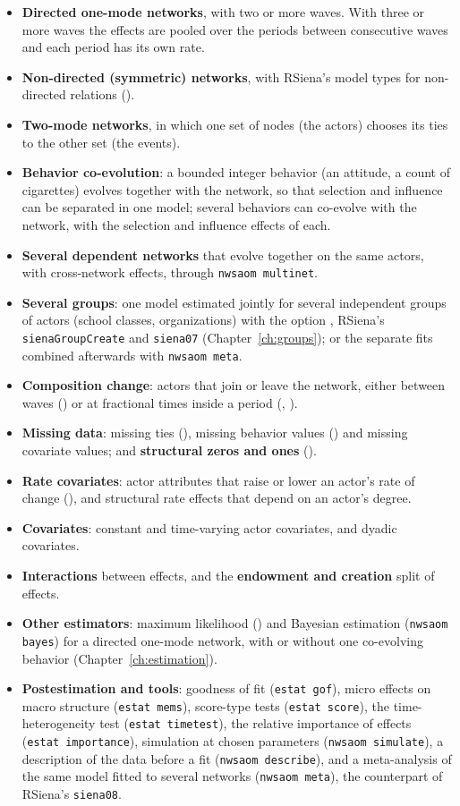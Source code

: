 \begin{itemize}[nosep]
  \item \textbf{Directed one-mode networks}, with two or more waves. With three or more waves the effects are pooled over the periods between consecutive waves and each period has its own rate.
  \item \textbf{Non-directed (symmetric) networks}, with RSiena's model types for non-directed relations ().
  \item \textbf{Two-mode networks}, in which one set of nodes (the actors) chooses its ties to the other set (the events).
  \item \textbf{Behavior co-evolution}: a bounded integer behavior (an attitude, a count of cigarettes) evolves together with the network, so that selection and influence can be separated in one model; several behaviors can co-evolve with the network, with the selection and influence effects of each.
  \item \textbf{Several dependent networks} that evolve together on the same actors, with cross-network effects, through \texttt{nwsaom multinet}.
  \item \textbf{Several groups}: one model estimated jointly for several independent groups of actors (school classes, organizations) with the option , RSiena's \texttt{sienaGroupCreate} and \texttt{siena07} (Chapter~\ref{ch:groups}); or the separate fits combined afterwards with \texttt{nwsaom meta}.
  \item \textbf{Composition change}: actors that join or leave the network, either between waves () or at fractional times inside a period (, ).
  \item \textbf{Missing data}: missing ties (), missing behavior values () and missing covariate values; and \textbf{structural zeros and ones} ().
  \item \textbf{Rate covariates}: actor attributes that raise or lower an actor's rate of change (), and structural rate effects that depend on an actor's degree.
  \item \textbf{Covariates}: constant and time-varying actor covariates, and dyadic covariates.
  \item \textbf{Interactions} between effects, and the \textbf{endowment and creation} split of effects.
  \item \textbf{Other estimators}: maximum likelihood () and Bayesian estimation (\texttt{nwsaom bayes}) for a directed one-mode network, with or without one co-evolving behavior (Chapter~\ref{ch:estimation}).
  \item \textbf{Postestimation and tools}: goodness of fit (\texttt{estat gof}), micro effects on macro structure (\texttt{estat mems}), score-type tests (\texttt{estat score}), the time-heterogeneity test (\texttt{estat timetest}), the relative importance of effects (\texttt{estat importance}), simulation at chosen parameters (\texttt{nwsaom simulate}), a description of the data before a fit (\texttt{nwsaom describe}), and a meta-analysis of the same model fitted to several networks (\texttt{nwsaom meta}), the counterpart of RSiena's \texttt{siena08}.
\end{itemize}
